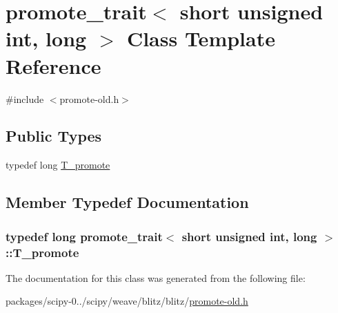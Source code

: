 \hypertarget{classpromote__trait_3_01short_01unsigned_01int_00_01long_01_4}{}\section{promote\+\_\+trait$<$ short unsigned int, long $>$ Class Template Reference}
\label{classpromote__trait_3_01short_01unsigned_01int_00_01long_01_4}


{\ttfamily \#include $<$promote-\/old.\+h$>$}

\subsection*{Public Types}
\begin{DoxyCompactItemize}
\item 
typedef long \hyperlink{classpromote__trait_3_01short_01unsigned_01int_00_01long_01_4_a85476b53195406b73929c7f6b44a1bcf}{T\+\_\+promote}
\end{DoxyCompactItemize}


\subsection{Member Typedef Documentation}
\hypertarget{classpromote__trait_3_01short_01unsigned_01int_00_01long_01_4_a85476b53195406b73929c7f6b44a1bcf}{}
\subsubsection[{T\+\_\+promote}]{\setlength{\rightskip}{0pt plus 5cm}typedef long {\bf promote\+\_\+trait}$<$ short unsigned int, long $>$\+::{\bf T\+\_\+promote}}\label{classpromote__trait_3_01short_01unsigned_01int_00_01long_01_4_a85476b53195406b73929c7f6b44a1bcf}


The documentation for this class was generated from the following file\+:\begin{DoxyCompactItemize}
\item 
packages/scipy-\/0../scipy/weave/blitz/blitz/\hyperlink{promote-old_8h}{promote-\/old.\+h}\end{DoxyCompactItemize}
